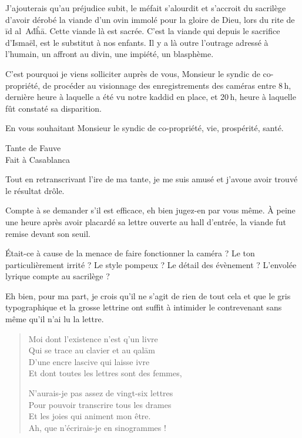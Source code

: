 J’ajouterais qu’au préjudice subit, le méfait s’alourdit et s’accroit du sacrilège d’avoir dérobé la viande d’un ovin immolé pour la gloire de Dieu, lors du rite de īd al Aḋĥā. Cette viande là est sacrée. C’est la viande qui depuis le sacrifice d’Ismaël, est le substitut à nos enfants. Il y a là outre l’outrage adressé à l’humain, un affront au divin, une
impiété, un blasphème.

C’est pourquoi je viens solliciter auprès de vous, Monsieur le syndic de co-propriété, de procéder au visionnage des enregistrements des caméras entre 8\,h, dernière heure à laquelle a été vu
notre kaddid en place, et 20\,h, heure à laquelle fût constaté sa disparition.

En vous souhaitant Monsieur le syndic de co-propriété, vie, prospérité, santé.
\nopagebreak\\\vspace{1cm}\nopagebreak
\hfill\nopagebreak
\begin{minipage}{4cm}
  \begin{center}
    \vspace{1cm}
    Tante de Fauve\\  %
    Fait à Casablanca
  \end{center}
\end{minipage}


\begin{prose}
  Tout en retranscrivant l’ire de ma tante, je me suis amusé et j’avoue avoir trouvé le résultat drôle.

  Compte à se demander s’il est efficace, eh bien jugez-en par vous même. À peine une heure après avoir placardé sa lettre ouverte au hall d’entrée, la viande fut remise devant son seuil.

  Était-ce à cause de la menace de faire fonctionner la caméra ? Le ton particulièrement irrité ? Le style pompeux ? Le détail des évènement ? L’envolée lyrique compte au sacrilège ?

  Eh bien, pour ma part, je crois qu’il ne s’agit de rien de tout cela et que le gris typographique et la grosse lettrine ont suffit à intimider le contrevenant sans même qu’il n’ai lu la lettre.
\end{prose}

\begin{verse}%
  \quatrain%
  Moi dont l’existence n’est q’un livre\\  %
  Qui se trace au clavier et au qalām\\  %
  D’une encre lascive qui laisse ivre\\  %
  Et dont toutes les lettres sont des femmes,

  N’aurais-je pas assez de vingt-six lettres\\  %
  Pour pouvoir transcrire tous les drames\\  %
  Et les joies  qui animent mon être.\\  %
  Ah, que n’écrirais-je en sinogrammes !
\end{verse}

